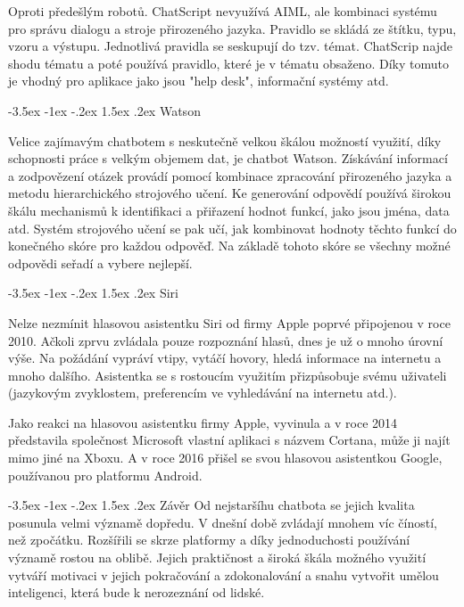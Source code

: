 \documentclass[a4paper,10pt]{article}
\makeatletter
\theoremstyle{definition}
\renewcommand\section{\@startsection {section}{1}{\z@}%
                                   {-3.5ex \@plus -1ex \@minus -.2ex}%
                                   {1.5ex \@plus.2ex}%
                                   {\large\bfseries}}
\renewcommand\subsection{\@startsection {subsection}{1}{\z@}%
                                   {-3.5ex \@plus -1ex \@minus -.2ex}%
                                   {1.5ex \@plus.2ex}%
                                   {\normalsize\bfseries}}
\makeatother
\begin{document}
Oproti předešlým robotů. ChatScript nevyužívá AIML, ale kombinaci systému pro správu dialogu a stroje přirozeného jazyka. Pravidlo se skládá ze štítku, typu, vzoru a výstupu. Jednotlivá pravidla se seskupují do tzv. témat. ChatScrip najde shodu tématu a poté používá pravidlo, které je v tématu obsaženo. Díky tomuto je vhodný pro aplikace jako jsou "help desk", informační systémy atd. 

\subsection{Watson}
\label{subsec:4}

Velice zajímavým chatbotem s neskutečně velkou škálou možností využití, díky schopnosti práce s velkým objemem dat, je chatbot Watson. Získávání informací a zodpovězení otázek provádí pomocí kombinace zpracování přirozeného jazyka a metodu hierarchického strojového učení. Ke generování odpovědí používá širokou škálu mechanismů k identifikaci a přiřazení hodnot funkcí, jako jsou jména, data atd. Systém strojového učení se pak učí, jak kombinovat hodnoty těchto funkcí do konečného skóre pro každou odpověď. Na základě tohoto skóre se všechny možné odpovědi seřadí a vybere nejlepší. 

\subsection{Siri}
\label{subsec:5}

Nelze nezmínit hlasovou asistentku Siri od firmy Apple poprvé připojenou v roce 2010. Ačkoli zprvu zvládala pouze rozpoznání hlasů, dnes je už o mnoho úrovní výše. Na požádání vypráví vtipy, vytáčí hovory, hledá informace na internetu a mnoho dalšího. Asistentka se s rostoucím využitím přizpůsobuje svému uživateli (jazykovým zvyklostem, preferencím ve vyhledávání na internetu atd.). \cite{c}

Jako reakci na hlasovou asistentku firmy Apple, vyvinula a v roce 2014 představila společnost Microsoft vlastní aplikaci s názvem Cortana, může ji najít mimo jiné na Xboxu. A v roce 2016 přišel se svou hlasovou asistentkou Google, používanou pro platformu Android.

\section{Závěr}
Od nejstaršíhu chatbota se jejich kvalita posunula velmi významě dopředu. V dnešní době zvládají mnohem víc číností, než zpočátku. Rozšířili se skrze platformy a díky jednoduchosti používání významě rostou na oblibě. Jejich praktičnost a široká škála možného využití vytváří motivaci v jejich pokračování a zdokonalování a snahu vytvořit umělou inteligenci, která bude k nerozeznání od lidské.\cite{6}\cite{2}
\end{document}
